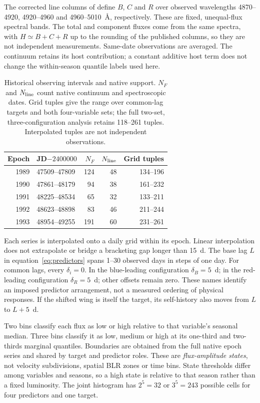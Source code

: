 \documentclass[fleqn,usenatbib]{mnras}
\begin{document}
The corrected line columns of \citet{WandersPeterson1996} define $B$, $C$ and $R$ over observed wavelengths 4870--4920, 4920--4960 and 4960--5010~\AA, respectively. These are fixed, unequal-flux spectral bands. The total and component fluxes come from the same spectra, with $H\simeq B+C+R$ up to the rounding of the published columns, so they are not independent measurements. Same-date observations are averaged. The continuum retains its host contribution; a constant additive host term does not change the within-season quantile labels used here.

\begin{table}
\centering
\caption{Historical observing intervals and native support. $N_F$ and $N_{\rm line}$ count native continuum and spectroscopic dates. Grid tuples give the range over common-lag targets and both four-variable sets; the full two-set, three-configuration analysis retains 118--261 tuples. Interpolated tuples are not independent observations.}
\label{tab:support}
\scriptsize
\begin{tabular}{rlrrr}
\toprule
Epoch & JD$-2400000$ & $N_F$ & $N_{\rm line}$ & Grid tuples \\
\midrule
1989 & 47509--47809 & 124 & 48 & 134--196 \\
1990 & 47861--48179 & 94 & 38 & 161--232 \\
1991 & 48225--48534 & 65 & 32 & 133--211 \\
1992 & 48623--48898 & 83 & 46 & 211--244 \\
1993 & 48954--49255 & 191 & 60 & 231--261 \\
\bottomrule
\end{tabular}
\end{table}

Each series is interpolated onto a daily grid within its epoch. Linear interpolation does not extrapolate or bridge a bracketing gap longer than 15~d. The base lag $L$ in equation~\eqref{eq:predictors} spans 1--30 observed days in steps of one day. For common lags, every $\delta_i=0$. In the blue-leading configuration $\delta_B=5$~d; in the red-leading configuration $\delta_R=5$~d; other offsets remain zero. These names identify an imposed predictor arrangement, not a measured ordering of physical responses. If the shifted wing is itself the target, its self-history also moves from $L$ to $L+5$~d.

Two bins classify each flux as low or high relative to that variable's seasonal median. Three bins classify it as low, medium or high at its one-third and two-thirds marginal quantiles. Boundaries are obtained from the full native epoch series and shared by target and predictor roles. These are \emph{flux-amplitude states}, not velocity subdivisions, spatial BLR zones or time bins. State thresholds differ among variables and seasons, so a high state is relative to that season rather than a fixed luminosity. The joint histogram has $2^5=32$ or $3^5=243$ possible cells for four predictors and one target.
\end{document}
